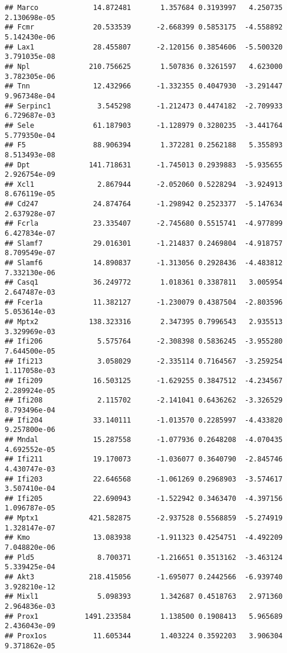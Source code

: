 \documentclass[
]{article}
\begin{document}
\begin{verbatim}
## Marco             14.872481       1.357684 0.3193997   4.250735 2.130698e-05
## Fcmr              20.533539      -2.668399 0.5853175  -4.558892 5.142430e-06
## Lax1              28.455807      -2.120156 0.3854606  -5.500320 3.791035e-08
## Npl              210.756625       1.507836 0.3261597   4.623000 3.782305e-06
## Tnn               12.432966      -1.332355 0.4047930  -3.291447 9.967348e-04
## Serpinc1           3.545298      -1.212473 0.4474182  -2.709933 6.729687e-03
## Sele              61.187903      -1.128979 0.3280235  -3.441764 5.779350e-04
## F5                88.906394       1.372281 0.2562188   5.355893 8.513493e-08
## Dpt              141.718631      -1.745013 0.2939883  -5.935655 2.926754e-09
## Xcl1               2.867944      -2.052060 0.5228294  -3.924913 8.676119e-05
## Cd247             24.874764      -1.298942 0.2523377  -5.147634 2.637928e-07
## Fcrla             23.335407      -2.745680 0.5515741  -4.977899 6.427834e-07
## Slamf7            29.016301      -1.214837 0.2469804  -4.918757 8.709549e-07
## Slamf6            14.890837      -1.313056 0.2928436  -4.483812 7.332130e-06
## Casq1             36.249772       1.018361 0.3387811   3.005954 2.647487e-03
## Fcer1a            11.382127      -1.230079 0.4387504  -2.803596 5.053614e-03
## Mptx2            138.323316       2.347395 0.7996543   2.935513 3.329969e-03
## Ifi206             5.575764      -2.308398 0.5836245  -3.955280 7.644500e-05
## Ifi213             3.058029      -2.335114 0.7164567  -3.259254 1.117058e-03
## Ifi209            16.503125      -1.629255 0.3847512  -4.234567 2.289924e-05
## Ifi208             2.115702      -2.141041 0.6436262  -3.326529 8.793496e-04
## Ifi204            33.140111      -1.013570 0.2285997  -4.433820 9.257800e-06
## Mndal             15.287558      -1.077936 0.2648208  -4.070435 4.692552e-05
## Ifi211            19.170073      -1.036077 0.3640790  -2.845746 4.430747e-03
## Ifi203            22.646568      -1.061269 0.2968903  -3.574617 3.507410e-04
## Ifi205            22.690943      -1.522942 0.3463470  -4.397156 1.096787e-05
## Mptx1            421.582875      -2.937528 0.5568859  -5.274919 1.328147e-07
## Kmo               13.083938      -1.911323 0.4254751  -4.492209 7.048820e-06
## Pld5               8.700371      -1.216651 0.3513162  -3.463124 5.339425e-04
## Akt3             218.415056      -1.695077 0.2442566  -6.939740 3.928210e-12
## Mixl1              5.098393       1.342687 0.4518763   2.971360 2.964836e-03
## Prox1           1491.233584       1.138500 0.1908413   5.965689 2.436043e-09
## Prox1os           11.605344       1.403224 0.3592203   3.906304 9.371862e-05

\end{verbatim}
\end{document}
